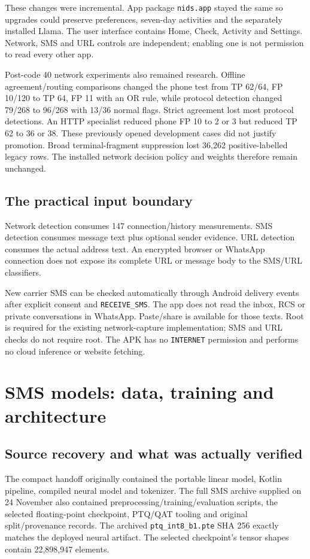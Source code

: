 \documentclass[11pt,a4paper,oneside]{report}
\newcommand{\code}[1]{\nolinkurl{#1}}
\begin{document}
These changes were incremental. App package \code{nids.app} stayed the same so upgrades could preserve preferences, seven-day activities and the separately installed Llama. The user interface contains Home, Check, Activity and Settings. Network, SMS and URL controls are independent; enabling one is not permission to read every other app.

Post-code 40 network experiments also remained research. Offline agreement/routing comparisons changed the phone test from TP 62/64, FP 10/120 to TP 64, FP 11 with an OR rule, while protocol detection changed 79/268 to 96/268 with 13/36 normal flags. Strict agreement lost most protocol detections. An HTTP specialist reduced phone FP 10 to 2 or 3 but reduced TP 62 to 36 or 38. These previously opened development cases did not justify promotion. Broad terminal-fragment suppression lost 36,262 positive-labelled legacy rows. The installed network decision policy and weights therefore remain unchanged.

\section{The practical input boundary}
Network detection consumes 147 connection/history measurements. SMS detection consumes message text plus optional sender evidence. URL detection consumes the actual address text. An encrypted browser or WhatsApp connection does not expose its complete URL or message body to the SMS/URL classifiers.

New carrier SMS can be checked automatically through Android delivery events after explicit consent and \code{RECEIVE_SMS}. The app does not read the inbox, RCS or private conversations in WhatsApp. Paste/share is available for those texts. Root is required for the existing network-capture implementation; SMS and URL checks do not require root. The APK has no \code{INTERNET} permission and performs no cloud inference or website fetching.

\chapter{SMS models: data, training and architecture}
\section{Source recovery and what was actually verified}
The compact handoff originally contained the portable linear model, Kotlin pipeline, compiled neural model and tokenizer. The full SMS archive supplied on 24 November also contained preprocessing/training/evaluation scripts, the selected floating-point checkpoint, PTQ/QAT tooling and original split/provenance records. The archived \code{ptq_int8_b1.pte} SHA 256 exactly matches the deployed neural artifact. The selected checkpoint's tensor shapes contain 22,898,947 elements.
\end{document}

